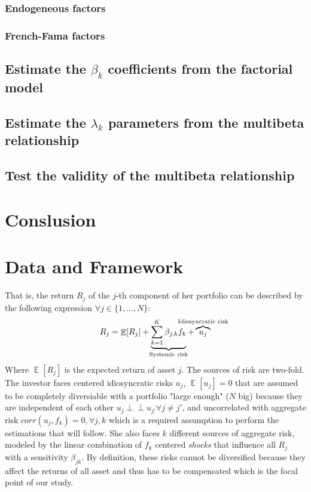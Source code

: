 \documentclass[hidelinks,11pts]{article}
\DeclareMathOperator{\E}{\mathbb{E}}
\DeclareMathOperator{\1}{\mathbbm{1}}
\newcommand{\ind}{\perp\!\!\!\!\perp}
\begin{document}
        \subsubsection{Endogeneous factors}
        \subsubsection{French-Fama factors}


    \subsection{Estimate the $\beta_k$ coefficients from the factorial model}

    \subsection{Estimate the $\lambda_k$ parameters from the multibeta relationship}
    
    \subsection{Test the validity of the multibeta relationship}


\section*{Conslusion}


\newpage
\newpage 
\section{Data and Framework}


That is, the return $R_j$ of the $j$-th component of her portfolio can be described by the following expression $\forall j\in \{1,...,N\}$: 
    \begin{equation} \label{eq:factorialmodel}
        R_j = \E[R_j] + \underbrace{\sum_{k=1}^K \beta_{j,k} f_k}_{\mathclap{\text{Systemic risk}}} + \overbrace{u_j}^{\mathclap{\text{Idiosyncratic risk}}}
    \end{equation}
Where $\E[R_j]$ is the expected return of asset $j$. 
The sources of risk are two-fold. 
The investor faces centered idiosyncratic risks $u_j$, $\E[u_j]=0$ that are assumed to be completely diversiable with a portfolio "large enough" ($N$ big) because they are independent of each other $u_j \ind u_{j'} \forall j\neq j' $, and uncorrelated with aggregate risk $corr(u_j, f_k) = 0, \forall j, k$ which is a required assumption to perform the estimations that will follow.
She also faces $k$ different sources of aggregate risk, modeled by the linear combination of $f_k$ centered \emph{shocks} that influence all $R_j$ with a sensitivity $\beta_{jk}$. 
By definition, these risks cannot be diversified because they affect the returns of all asset and thus has to be compensated which is the focal point of our study. 
\end{document}
